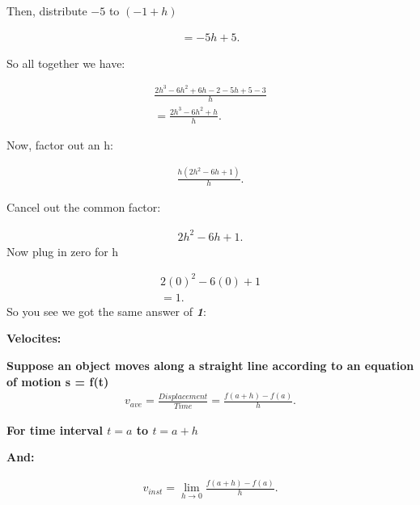 \documentclass{report}
\begin{document}
        \bigbreak \noindent 
        Then, distribute $-5$ to $(-1+h)$

        \begin{align*}
            = -5h + 5
        .\end{align*}

        \bigbreak \noindent 
        So all together we have:

        \begin{align*}
            \frac{2h^3-6h^2+6h-2-5h+5-3}{h} \\ 
            = \frac{2h^3 -6h^2 + h}{h}
        .\end{align*}

        \bigbreak \noindent 
        Now, factor out an h:

        \begin{align*}
            \frac{h \left(2h^2-6h+1\right)}{h}  
        .\end{align*}

        \bigbreak \noindent 
        Cancel out the common factor:

        \begin{align*}
            2h^2-6h+1
        .\end{align*}
        \bigbreak \noindent 
        Now plug in zero for h 

        \begin{align*}
            2 \left(0\right)^2 - 6 \left(0\right) + 1 \\ 
            = 1
        .\end{align*}
        \bigbreak \noindent 
        So you see we got the same answer of \textbf{\textit{1}}:

        \pagebreak \bigbreak \noindent
        \begin{large}
            \textbf{Velocites:}
        \end{large}

        \bigbreak \noindent \bigbreak \noindent 
        \textbf{Suppose an object moves along a straight line according to an equation of motion s = f(t)}
        \begin{align*}
            v_{ave} = \frac{Displacement}{Time} = \frac{f(a+ h) - f(a)}{h}
        .\end{align*}

        \bigbreak \noindent 
        \textbf{For time interval $t = a$ to $t = a + h$}
        \begin{center}
            \textbf{And:}
        \end{center}
        \begin{align*}
            v_{inst} = \lim\limits_{h \to 0}{ \frac{f(a+h) - f(a)}{h}}
        .\end{align*}
\end{document}
